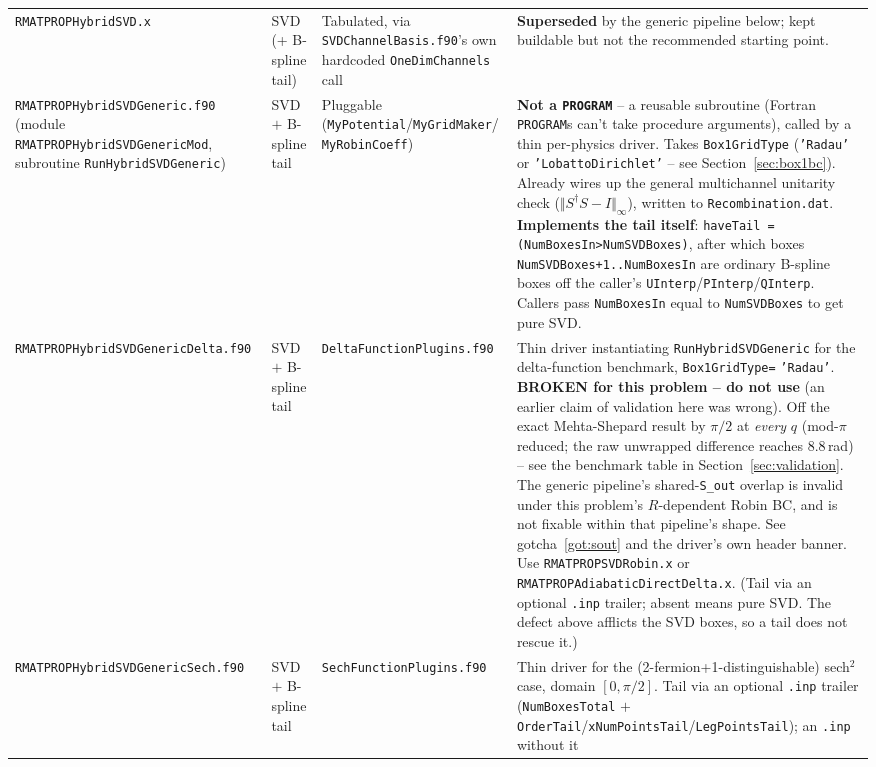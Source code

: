 \documentclass[11pt]{article}
\newcommand{\file}[1]{\texttt{#1}}
\newcommand{\sub}[1]{\texttt{#1}}
\begin{document}
{\begin{longtable}{@{}p{3.3cm}p{2cm}p{3cm}p{7cm}@{}}
\file{RMATPROPHybridSVD.x} & SVD (+ B-spline tail) & Tabulated, via
  \file{SVDChannelBasis.f90}'s own hardcoded \sub{OneDimChannels} call & \textbf{Superseded} by
  the generic pipeline below; kept buildable but not the recommended starting point. \\
\file{RMATPROPHybridSVDGeneric.f90} (module \texttt{RMATPROPHybridSVDGenericMod}, subroutine
  \sub{RunHybridSVDGeneric}) & SVD $+$ B-spline tail & Pluggable (\texttt{MyPotential}/\texttt{MyGridMaker}/
  \texttt{MyRobinCoeff}) & \textbf{Not a \texttt{PROGRAM}} -- a reusable subroutine (Fortran
  \texttt{PROGRAM}s can't take procedure arguments), called by a thin per-physics driver. Takes
  \texttt{Box1GridType} (\texttt{'Radau'} or \texttt{'LobattoDirichlet'} --
  see Section~\ref{sec:box1bc}). Already wires up the general multichannel unitarity check
  ($\Vert S^\dagger S-I\Vert_\infty$), written to \texttt{Recombination.dat}.
  \textbf{Implements the tail itself}: \texttt{haveTail\,=\,(NumBoxesIn>NumSVDBoxes)}, after which
  boxes \texttt{NumSVDBoxes+1..NumBoxesIn} are ordinary B-spline boxes off the caller's
  \texttt{UInterp}/\texttt{PInterp}/\texttt{QInterp}. Callers pass \texttt{NumBoxesIn} equal to
  \texttt{NumSVDBoxes} to get pure SVD. \\
\file{RMATPROPHybridSVDGenericDelta.f90} & SVD $+$ B-spline tail & \file{DeltaFunctionPlugins.f90} & Thin driver
  instantiating \sub{RunHybridSVDGeneric} for the delta-function benchmark, \texttt{Box1GridType=}
  \texttt{'Radau'}. \textbf{BROKEN for this problem -- do not use} (an earlier claim of validation
  here was wrong). Off the exact Mehta-Shepard result by $\pi/2$ at \emph{every} $q$ (mod-$\pi$
  reduced; the raw unwrapped difference reaches $8.8$\,rad) -- see the benchmark table in
  Section~\ref{sec:validation}. The generic
  pipeline's shared-\texttt{S\_out} overlap is invalid under this problem's $R$-dependent Robin BC,
  and is not fixable within that pipeline's shape. See gotcha~\ref{got:sout} and the driver's own
  header banner. Use \file{RMATPROPSVDRobin.x} or \file{RMATPROPAdiabaticDirectDelta.x}.
  (Tail via an optional \texttt{.inp} trailer; absent means pure SVD. The defect above afflicts the
  SVD boxes, so a tail does not rescue it.) \\
\file{RMATPROPHybridSVDGenericSech.f90} & SVD $+$ B-spline tail & \file{SechFunctionPlugins.f90} &
  Thin driver for the (2-fermion+1-distinguishable) sech$^2$ case, domain $[0,\pi/2]$. Tail via an
  optional \texttt{.inp} trailer (\texttt{NumBoxesTotal} $+$
  \texttt{OrderTail}/\texttt{xNumPointsTail}/\texttt{LegPointsTail}); an \texttt{.inp} without it

\end{longtable}}
\end{document}

